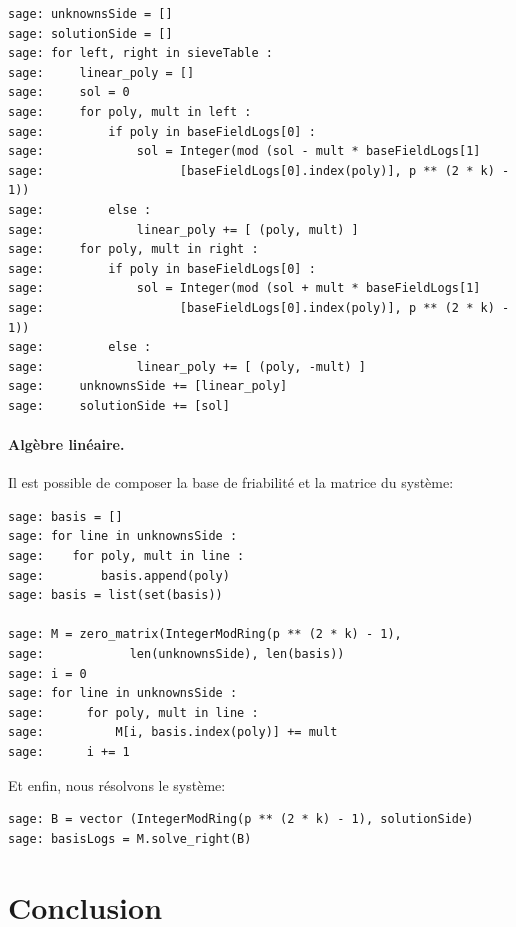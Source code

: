 \documentclass[a4paper, titlepage, 11pt]{article}
\theoremstyle{definition}
\theoremstyle{remark}
\begin{document}
\begin{verbatim}
sage: unknownsSide = []
sage: solutionSide = []
sage: for left, right in sieveTable :
sage:     linear_poly = []
sage:     sol = 0
sage:     for poly, mult in left :
sage:         if poly in baseFieldLogs[0] :
sage:             sol = Integer(mod (sol - mult * baseFieldLogs[1]
sage:                   [baseFieldLogs[0].index(poly)], p ** (2 * k) - 1))
sage:         else :
sage:             linear_poly += [ (poly, mult) ]
sage:     for poly, mult in right :
sage:         if poly in baseFieldLogs[0] :
sage:             sol = Integer(mod (sol + mult * baseFieldLogs[1]
sage:                   [baseFieldLogs[0].index(poly)], p ** (2 * k) - 1))
sage:         else :
sage:             linear_poly += [ (poly, -mult) ]
sage:     unknownsSide += [linear_poly]
sage:     solutionSide += [sol]
\end{verbatim}

\paragraph{Algèbre linéaire.}Il est possible de composer la base de friabilité et la matrice du système:
\begin{verbatim}
sage: basis = []
sage: for line in unknownsSide :
sage:    for poly, mult in line :
sage:        basis.append(poly)
sage: basis = list(set(basis))

sage: M = zero_matrix(IntegerModRing(p ** (2 * k) - 1), 
sage:            len(unknownsSide), len(basis))
sage: i = 0
sage: for line in unknownsSide :
sage:      for poly, mult in line :
sage:          M[i, basis.index(poly)] += mult
sage:      i += 1
\end{verbatim}
Et enfin, nous résolvons le système:
\begin{verbatim}
sage: B = vector (IntegerModRing(p ** (2 * k) - 1), solutionSide)
sage: basisLogs = M.solve_right(B)
\end{verbatim}

\section*{Conclusion}

\newpage
\thispagestyle{empty}


\end{document}
